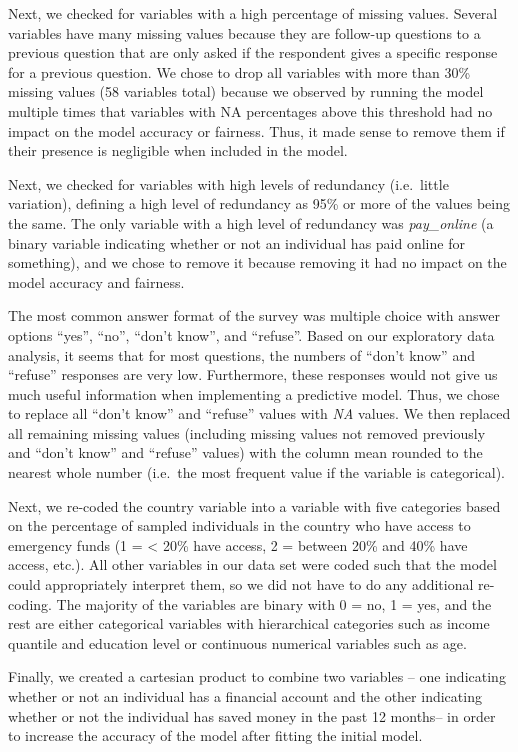 \documentclass[water,article,submit,moreauthors,pdftex]{mdpi}
\begin{document}
Next, we checked for variables with a high percentage of missing values.
Several variables have many missing values because they are follow-up
questions to a previous question that are only asked if the respondent
gives a specific response for a previous question. We chose to drop all
variables with more than 30\% missing values (58 variables total)
because we observed by running the model multiple times that variables
with NA percentages above this threshold had no impact on the model
accuracy or fairness. Thus, it made sense to remove them if their
presence is negligible when included in the model.

Next, we checked for variables with high levels of redundancy
(i.e.~little variation), defining a high level of redundancy as 95\% or
more of the values being the same. The only variable with a high level
of redundancy was \emph{pay\_online} (a binary variable indicating
whether or not an individual has paid online for something), and we
chose to remove it because removing it had no impact on the model
accuracy and fairness.

The most common answer format of the survey was multiple choice with
answer options ``yes'', ``no'', ``don't know'', and ``refuse''. Based on
our exploratory data analysis, it seems that for most questions, the
numbers of ``don't know'' and ``refuse'' responses are very low.
Furthermore, these responses would not give us much useful information
when implementing a predictive model. Thus, we chose to replace all
``don't know'' and ``refuse'' values with \emph{NA} values. We then
replaced all remaining missing values (including missing values not
removed previously and ``don't know'' and ``refuse'' values) with the
column mean rounded to the nearest whole number (i.e.~the most frequent
value if the variable is categorical).

Next, we re-coded the country variable into a variable with five
categories based on the percentage of sampled individuals in the country
who have access to emergency funds (1 = \textless{} 20\% have access, 2
= between 20\% and 40\% have access, etc.). All other variables in our
data set were coded such that the model could appropriately interpret
them, so we did not have to do any additional re-coding. The majority of
the variables are binary with 0 = no, 1 = yes, and the rest are either
categorical variables with hierarchical categories such as income
quantile and education level or continuous numerical variables such as
age.

Finally, we created a cartesian product to combine two variables -- one
indicating whether or not an individual has a financial account and the
other indicating whether or not the individual has saved money in the
past 12 months-- in order to increase the accuracy of the model after
fitting the initial model.
\end{document}
